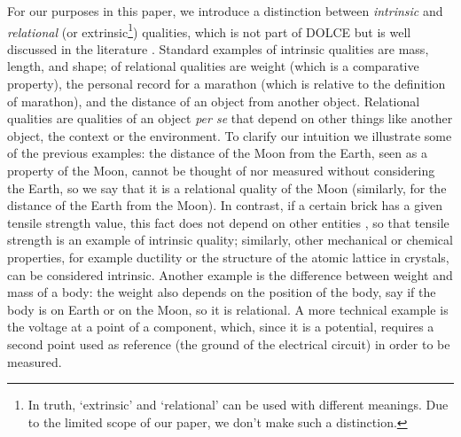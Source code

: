 \documentclass[sw]{iosart2x}
\newcommand{\DOLCE}{\textsc{DOLCE}\xspace} %
\newcommand{\firstTimeKeyWord}[1]{\textit{#1}}
\newcommand{\myComment}[1]{{\unskip \ignorespaces}}
\begin{document}
For our purposes in this paper, we \myComment{add} introduce a distinction between \firstTimeKeyWord{intrinsic} and \firstTimeKeyWord{relational} (or extrinsic\footnote{In truth, `extrinsic' and `relational' can be used with different meanings. Due to the limited scope of our paper, we don't make such a distinction.}) qualities, which is not part of \DOLCE but is well discussed in the literature \cite{sep-intrinsic-extrinsic}. 
Standard examples of intrinsic qualities are mass, length, and shape; %
of relational qualities are weight (which is a comparative property), the personal record for a marathon (which is relative to the definition of marathon), and the distance of an object from another object. %
Relational qualities are \myComment{not} qualities of an object \textit{per se} \myComment{, but} that depend on other things like another object, the context or \myComment{something in} the environment.
To clarify our intuition we illustrate some of the previous examples: the distance of the Moon from the Earth, seen as a property of the Moon, cannot be thought of nor measured without considering the Earth, so we say that it is a relational quality of the Moon (similarly, for the distance of the Earth from the Moon). In contrast, if a certain brick has a given tensile strength value, %
this fact does not depend on other entities%
, so that tensile strength is an example of intrinsic quality; 
similarly, other mechanical or chemical properties, for example ductility or the structure of the atomic lattice in crystals, can be considered intrinsic. 
Another example is the difference between weight and mass of a body: the weight also depends on the position of the body, say if the body is on Earth or on the Moon, so it is relational. 
A more technical example is the voltage at a point of a component, which, since it is a potential, requires a second point used as  reference (the ground of the electrical circuit) in order to be measured. 
\end{document}
